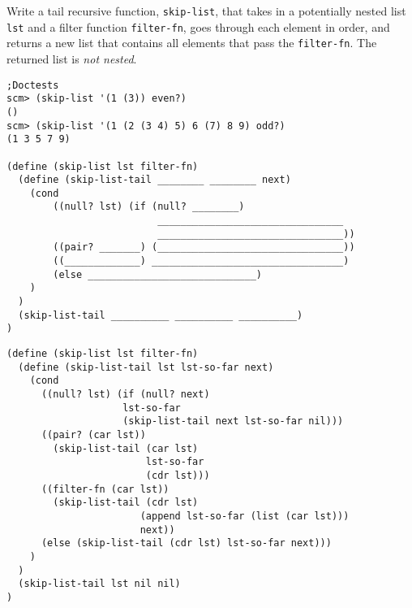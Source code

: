 \begin{blocksection}

\question Write a tail recursive function, \lstinline{skip-list}, that takes in a potentially nested list \lstinline{lst} and a filter function \lstinline{filter-fn}, goes through each element in order, and returns a new list that contains all elements that pass the \lstinline{filter-fn}. The returned list is \textit{not nested}.

\begin{lstlisting}
;Doctests
scm> (skip-list '(1 (3)) even?)
()
scm> (skip-list '(1 (2 (3 4) 5) 6 (7) 8 9) odd?)
(1 3 5 7 9)

(define (skip-list lst filter-fn) 
  (define (skip-list-tail ________ ________ next)
    (cond
        ((null? lst) (if (null? ________) 
                          ________________________________
                          ________________________________))
        ((pair? _______) (________________________________))
        ((_____________) _________________________________)
        (else _____________________________)
    )
  )
  (skip-list-tail __________ __________ __________)
)
\end{lstlisting}
\end{blocksection}

\begin{blocksection}
\begin{solution}
\begin{lstlisting}
(define (skip-list lst filter-fn) 
  (define (skip-list-tail lst lst-so-far next)
    (cond
      ((null? lst) (if (null? next) 
                    lst-so-far
                    (skip-list-tail next lst-so-far nil)))
      ((pair? (car lst)) 
        (skip-list-tail (car lst) 
                        lst-so-far 
                        (cdr lst)))
      ((filter-fn (car lst)) 
        (skip-list-tail (cdr lst) 
                       (append lst-so-far (list (car lst))) 
                       next))
      (else (skip-list-tail (cdr lst) lst-so-far next)))
    )
  )
  (skip-list-tail lst nil nil)
)

\end{lstlisting}
\end{solution}

\end{blocksection}